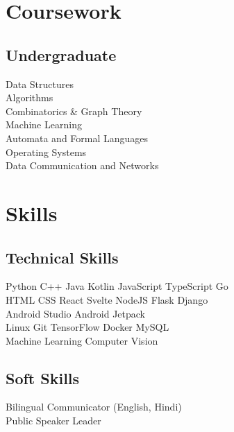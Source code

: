 \documentclass[]{deedy-resume-openfont}
\begin{document}
\begin{minipage}[t]{0.30\textwidth}
\section{Coursework}

\subsection{Undergraduate}
Data Structures \\
Algorithms \\
Combinatorics \& Graph Theory \\
Machine Learning \\
Automata and Formal Languages \\
Operating Systems \\
Data Communication and Networks \\

\section{Skills}
\subsection{Technical Skills}
Python \textbullet{} C++ \textbullet{} Java \textbullet{} Kotlin \textbullet{} JavaScript \textbullet{} TypeScript \textbullet{} Go \\
\vspace{2mm}
HTML \textbullet{} CSS \textbullet{} React \textbullet{} Svelte \textbullet{} NodeJS \textbullet{} Flask \textbullet{} Django \\
\vspace{2mm}
Android Studio \textbullet{} Android Jetpack \\
\vspace{2mm}
Linux \textbullet{} Git \textbullet{} TensorFlow \textbullet{} Docker \textbullet{} MySQL \\
\vspace{2mm}
Machine Learning \textbullet{} Computer Vision
\sectionsep

\subsection{Soft Skills}
Bilingual Communicator (English, Hindi) \\
Public Speaker \textbullet{} Leader

\end{minipage}
\end{document}
